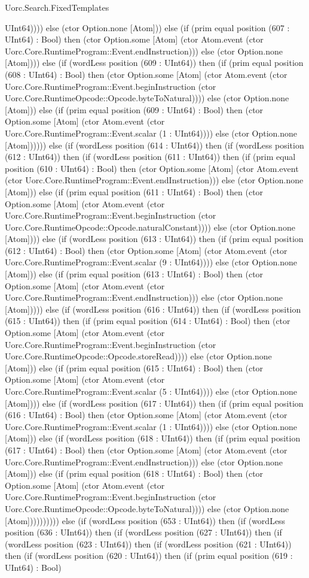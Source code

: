 \begin{lexlean}{Uorc.Search.FixedTemplates}
\begin{semanticmodule}
{UInt64)))) else (ctor Option.none [Atom])) else (if (prim equal position (607 : UInt64) : Bool) then (ctor Option.some [Atom] (ctor Atom.event (ctor Uorc.Core.RuntimeProgram::Event.endInstruction))) else (ctor Option.none [Atom]))) else (if (wordLess position (609 : UInt64)) then (if (prim equal position (608 : UInt64) : Bool) then (ctor Option.some [Atom] (ctor Atom.event (ctor Uorc.Core.RuntimeProgram::Event.beginInstruction (ctor Uorc.Core.RuntimeOpcode::Opcode.byteToNatural)))) else (ctor Option.none [Atom])) else (if (prim equal position (609 : UInt64) : Bool) then (ctor Option.some [Atom] (ctor Atom.event (ctor Uorc.Core.RuntimeProgram::Event.scalar (1 : UInt64)))) else (ctor Option.none [Atom]))))) else (if (wordLess position (614 : UInt64)) then (if (wordLess position (612 : UInt64)) then (if (wordLess position (611 : UInt64)) then (if (prim equal position (610 : UInt64) : Bool) then (ctor Option.some [Atom] (ctor Atom.event (ctor Uorc.Core.RuntimeProgram::Event.endInstruction))) else (ctor Option.none [Atom])) else (if (prim equal position (611 : UInt64) : Bool) then (ctor Option.some [Atom] (ctor Atom.event (ctor Uorc.Core.RuntimeProgram::Event.beginInstruction (ctor Uorc.Core.RuntimeOpcode::Opcode.naturalConstant)))) else (ctor Option.none [Atom]))) else (if (wordLess position (613 : UInt64)) then (if (prim equal position (612 : UInt64) : Bool) then (ctor Option.some [Atom] (ctor Atom.event (ctor Uorc.Core.RuntimeProgram::Event.scalar (9 : UInt64)))) else (ctor Option.none [Atom])) else (if (prim equal position (613 : UInt64) : Bool) then (ctor Option.some [Atom] (ctor Atom.event (ctor Uorc.Core.RuntimeProgram::Event.endInstruction))) else (ctor Option.none [Atom])))) else (if (wordLess position (616 : UInt64)) then (if (wordLess position (615 : UInt64)) then (if (prim equal position (614 : UInt64) : Bool) then (ctor Option.some [Atom] (ctor Atom.event (ctor Uorc.Core.RuntimeProgram::Event.beginInstruction (ctor Uorc.Core.RuntimeOpcode::Opcode.storeRead)))) else (ctor Option.none [Atom])) else (if (prim equal position (615 : UInt64) : Bool) then (ctor Option.some [Atom] (ctor Atom.event (ctor Uorc.Core.RuntimeProgram::Event.scalar (5 : UInt64)))) else (ctor Option.none [Atom]))) else (if (wordLess position (617 : UInt64)) then (if (prim equal position (616 : UInt64) : Bool) then (ctor Option.some [Atom] (ctor Atom.event (ctor Uorc.Core.RuntimeProgram::Event.scalar (1 : UInt64)))) else (ctor Option.none [Atom])) else (if (wordLess position (618 : UInt64)) then (if (prim equal position (617 : UInt64) : Bool) then (ctor Option.some [Atom] (ctor Atom.event (ctor Uorc.Core.RuntimeProgram::Event.endInstruction))) else (ctor Option.none [Atom])) else (if (prim equal position (618 : UInt64) : Bool) then (ctor Option.some [Atom] (ctor Atom.event (ctor Uorc.Core.RuntimeProgram::Event.beginInstruction (ctor Uorc.Core.RuntimeOpcode::Opcode.byteToNatural)))) else (ctor Option.none [Atom]))))))))) else (if (wordLess position (653 : UInt64)) then (if (wordLess position (636 : UInt64)) then (if (wordLess position (627 : UInt64)) then (if (wordLess position (623 : UInt64)) then (if (wordLess position (621 : UInt64)) then (if (wordLess position (620 : UInt64)) then (if (prim equal position (619 : UInt64) : Bool) }
\end{semanticmodule}
\end{lexlean}
